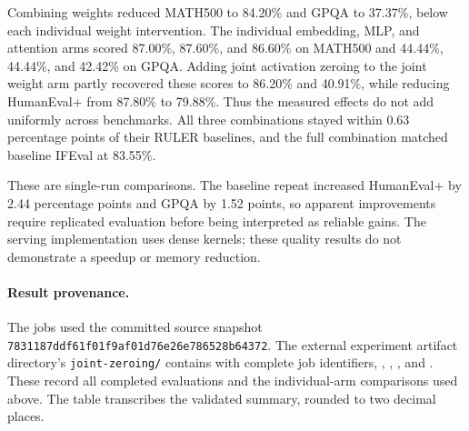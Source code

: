 Combining weights reduced MATH500 to 84.20\% and GPQA to 37.37\%, below each
individual weight intervention. The individual embedding, MLP, and attention
arms scored 87.00\%, 87.60\%, and 86.60\% on MATH500 and 44.44\%, 44.44\%,
and 42.42\% on GPQA. Adding joint activation zeroing to the joint weight arm
partly recovered these scores to 86.20\% and 40.91\%, while reducing HumanEval+
from 87.80\% to 79.88\%. Thus the measured effects do not add uniformly across
benchmarks. All three combinations stayed within 0.63 percentage points of their
RULER baselines, and the full combination matched baseline IFEval at 83.55\%.

These are single-run comparisons. The baseline repeat increased HumanEval+ by
2.44 percentage points and GPQA by 1.52 points, so apparent improvements require
replicated evaluation before being interpreted as reliable gains. The serving
implementation uses dense kernels; these quality results do not demonstrate a
speedup or memory reduction.

\paragraph{Result provenance.}
{\raggedright
The jobs used the committed source snapshot
\texttt{7831187ddf61f01f9af01d76e26e786528b64372}.
The external experiment artifact directory's \texttt{joint-zeroing/} contains
 with complete job identifiers,
, ,
, and .
These record all completed evaluations and the individual-arm comparisons used
above. The table transcribes the validated summary, rounded to two decimal places.
\par}
